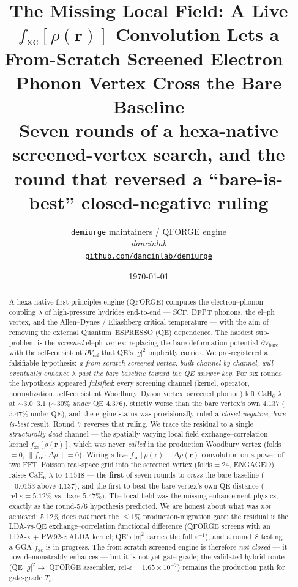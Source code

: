 \documentclass[11pt,a4paper]{article}
\title{
  \textbf{The Missing Local Field: A Live $f_{\mathrm{xc}}[\rho(\mathbf{r})]$
  Convolution Lets a From-Scratch Screened Electron--Phonon Vertex Cross the
  Bare Baseline}\\[4pt]
  \large Seven rounds of a hexa-native screened-vertex search, and the
  round that reversed a ``bare-is-best'' closed-negative ruling
}
\author{
  \texttt{demiurge} maintainers / QFORGE engine\\
  \normalsize\textit{dancinlab}\\[2pt]
  \normalsize\href{https://github.com/dancinlab/demiurge}{\texttt{github.com/dancinlab/demiurge}}
}
\date{\today}
\begin{document}
\maketitle

\begin{abstract}
A hexa-native first-principles engine (QFORGE) computes the electron--phonon
coupling $\lambda$ of high-pressure hydrides end-to-end --- SCF, DFPT phonons,
the el--ph vertex, and the Allen--Dynes / Eliashberg critical temperature ---
with the aim of removing the external Quantum~ESPRESSO (QE) dependence. The
hardest sub-problem is the \emph{screened} el--ph vertex: replacing the bare
deformation potential $\partial V_{\mathrm{bare}}$ with the self-consistent
$\partial V_{\mathrm{scf}}$ that QE's $|g|^2$ implicitly carries. We
pre-registered a falsifiable hypothesis: \emph{a from-scratch screened vertex,
built channel-by-channel, will eventually enhance $\lambda$ past the bare
baseline toward the QE answer key}. For six rounds the hypothesis appeared
\emph{falsified}: every screening channel (kernel, operator, normalization,
self-consistent Woodbury--Dyson vertex, screened phonon) left CaH$_6$
$\lambda$ at $\sim\!3.0\text{--}3.1$ ($\sim\!30\%$ \emph{under} QE $4.376$),
strictly worse than the bare vertex's own $4.137$ ($5.47\%$ under QE), and the
engine status was provisionally ruled a \emph{closed-negative, bare-is-best}
result. Round~7 reverses that ruling. We trace the residual to a single
\emph{structurally dead} channel --- the spatially-varying local-field
exchange--correlation kernel $f_{\mathrm{xc}}[\rho(\mathbf{r})]$, which was
never \emph{called} in the production Woodbury vertex (folds$=0$,
$\lVert f_{\mathrm{xc}}\!\cdot\!\Delta\rho\rVert=0$). Wiring a live
$f_{\mathrm{xc}}[\rho(\mathbf{r})]\!\cdot\!\Delta\rho(\mathbf{r})$ convolution
on a power-of-two FFT--Poisson real-space grid into the screened vertex
(folds$=24$, ENGAGED) raises CaH$_6$ $\lambda$ to $4.1518$ --- the
\textbf{first} of seven rounds to \emph{cross} the bare baseline
($+0.0153$ above $4.137$), and the first to beat the bare vertex's own
QE-distance ($\mathrm{rel}\text{-}\varepsilon = 5.12\%$ vs.\ bare $5.47\%$).
The local field was the missing enhancement physics, exactly as the
round-5/6 hypothesis predicted. We are honest about what was \emph{not}
achieved: $5.12\%$ does \emph{not} meet the $\le\!1\%$ production-migration
gate; the residual is the LDA-vs-QE exchange--correlation functional
difference (QFORGE screens with an LDA-x $+$ PW92-c ALDA kernel; QE's $|g|^2$
carries the full $\varepsilon^{-1}$), and a round~8 testing a GGA
$f_{\mathrm{xc}}$ is in progress. The from-scratch screened engine is
therefore \emph{not closed} --- it now demonstrably enhances --- but it is
not yet gate-grade; the validated hybrid route (QE $|g|^2 \to$ QFORGE
assembler, $\mathrm{rel}\text{-}\varepsilon = 1.65\times10^{-7}$) remains the
production path for gate-grade $T_c$.
\end{abstract}
\end{document}

